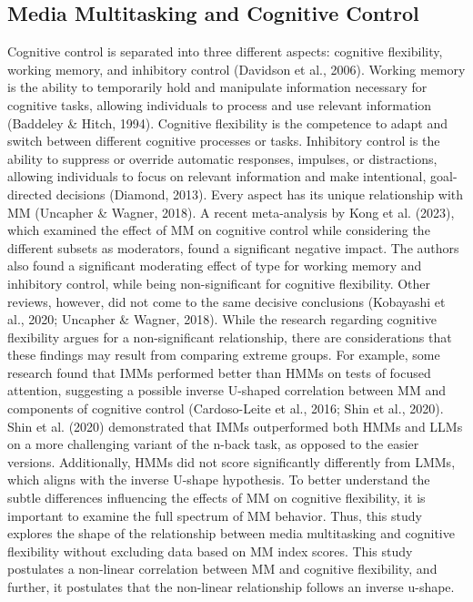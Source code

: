 \documentclass[
  man]{apa7}
\begin{document}
\subsection{Media Multitasking and Cognitive Control}\label{media-multitasking-and-cognitive-control}

Cognitive control is separated into three different aspects: cognitive flexibility, working memory, and inhibitory control (Davidson et al., 2006). Working memory is the ability to temporarily hold and manipulate information necessary for cognitive tasks, allowing individuals to process and use relevant information (Baddeley \& Hitch, 1994). Cognitive flexibility is the competence to adapt and switch between different cognitive processes or tasks. Inhibitory control is the ability to suppress or override automatic responses, impulses, or distractions, allowing individuals to focus on relevant information and make intentional, goal-directed decisions (Diamond, 2013). Every aspect has its unique relationship with MM (Uncapher \& Wagner, 2018). A recent meta-analysis by Kong et al. (2023), which examined the effect of MM on cognitive control while considering the different subsets as moderators, found a significant negative impact. The authors also found a significant moderating effect of type for working memory and inhibitory control, while being non-significant for cognitive flexibility. Other reviews, however, did not come to the same decisive conclusions (Kobayashi et al., 2020; Uncapher \& Wagner, 2018). While the research regarding cognitive flexibility argues for a non-significant relationship, there are considerations that these findings may result from comparing extreme groups. For example, some research found that IMMs performed better than HMMs on tests of focused attention, suggesting a possible inverse U-shaped correlation between MM and components of cognitive control (Cardoso-Leite et al., 2016; Shin et al., 2020). Shin et al. (2020) demonstrated that IMMs outperformed both HMMs and LLMs on a more challenging variant of the n-back task, as opposed to the easier versions. Additionally, HMMs did not score significantly differently from LMMs, which aligns with the inverse U-shape hypothesis. To better understand the subtle differences influencing the effects of MM on cognitive flexibility, it is important to examine the full spectrum of MM behavior. Thus, this study explores the shape of the relationship between media multitasking and cognitive flexibility without excluding data based on MM index scores. This study postulates a non-linear correlation between MM and cognitive flexibility, and further, it postulates that the non-linear relationship follows an inverse u-shape.
\end{document}
